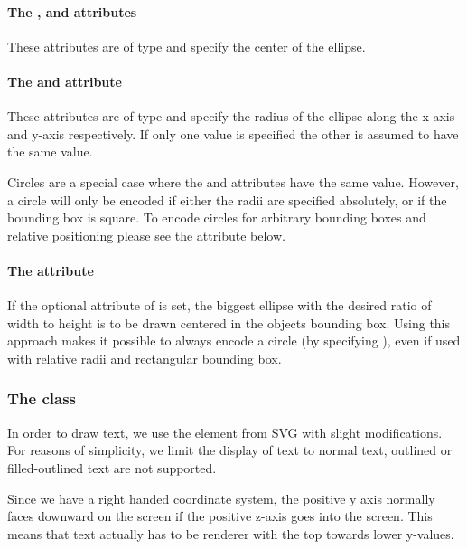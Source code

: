 \paragraph{The \fixttspace{}, \fixttspace{} and \fixttspace{}  attributes}

These attributes are of type
\RelAbsVector and specify the center of the ellipse.

\paragraph{The \fixttspace{} and \fixttspace{} attribute}

These attributes are of type
\RelAbsVector and specify the radius of the ellipse along the x-axis and y-axis 
respectively. If only one value is specified the other is assumed to have the same value. 

Circles are a special case where the  and  attributes have the same value. However, 
a circle will only be encoded if either the radii are specified absolutely, or if the bounding box is square. 
To encode circles for arbitrary bounding boxes and relative positioning please see the  
attribute below.

\paragraph{The \fixttspace{} attribute}
If the optional  attribute of  is set, the biggest 
ellipse with the desired ratio of width to height is to be drawn centered in the 
objects bounding box. Using this approach makes it possible to always encode a 
circle (by specifying ), even if used with relative radii and 
rectangular bounding box. 

\subsubsection{The  class}
\label{text-class}

In order to draw text, we use the  element from SVG with slight 
modifications. For reasons of simplicity, we limit the display of text to normal text, 
outlined or filled-outlined text are not supported.

Since we have a right handed coordinate system, the positive y axis normally faces downward on the screen if the positive
z-axis goes into the screen. This means that text actually has to be renderer with the top towards lower y-values.


